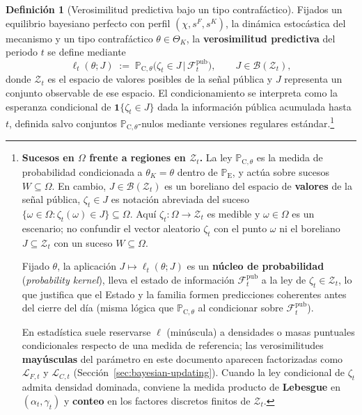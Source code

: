 \documentclass[12pt]{article}
\newenvironment{fnnote}{%
  \begin{minipage}[t]{\linewidth}%
  \sloppy
}{\end{minipage}}
\theoremstyle{definition}
\newtheorem{definition}[theorem]{Definición}
\theoremstyle{remark}
\newcommand{\ProbE}{\mathbb{P}_{\mathrm{E}}}
\newcommand{\ProbC}[1]{\mathbb{P}_{\mathrm{C},#1}}
\newcommand{\1}{\mathbf{1}}
\begin{document}
\begin{definition}[Verosimilitud predictiva bajo un tipo contrafáctico]
\label{def:predictive-likelihood}
Fijados un equilibrio bayesiano perfecto con perfil $(\chi,s^F,s^K)$, la dinámica estocástica del mecanismo y un tipo contrafáctico $\theta\in\Theta_K$, la \textbf{verosimilitud predictiva} del periodo $t$ se define mediante
\begin{equation}
\label{eq:likelihood-zeta}
\ell_t(\theta;J)\;:=\;\ProbC{\theta}\bigl(\zeta_t \in J \,\big|\, \mathcal{F}_t^{\mathrm{pub}}\bigr),
\qquad J\in\mathcal{B}(\mathcal{Z}_t),
\end{equation}
donde $\mathcal{Z}_t$ es el espacio de valores posibles de la señal pública y $J$ representa un conjunto observable de ese espacio. El condicionamiento se interpreta como la esperanza condicional de $\mathbf{1}\{\zeta_t\in J\}$ dada la información pública acumulada hasta $t$, definida salvo conjuntos $\ProbC{\theta}$-nulos mediante versiones regulares estándar.\footnote{%
\begin{fnnote}\textbf{Sucesos en $\Omega$ frente a regiones en $\mathcal{Z}_t$.} La ley $\ProbC{\theta}$ es la medida de probabilidad condicionada a $\theta_K=\theta$ dentro de $\ProbE$, y actúa sobre sucesos $W\subseteq\Omega$. En cambio, $J\in\mathcal{B}(\mathcal{Z}_t)$ es un boreliano del espacio de \textbf{valores} de la señal pública, $\zeta_t\in J$ es notación abreviada del suceso $\{\omega\in\Omega:\zeta_t(\omega)\in J\}\subseteq\Omega$. Aquí $\zeta_t:\Omega\to\mathcal{Z}_t$ es medible y $\omega\in\Omega$ es un escenario; no confundir el vector aleatorio $\zeta_t$ con el punto $\omega$ ni el boreliano $J\subseteq\mathcal{Z}_t$ con un suceso $W\subseteq\Omega$.
\par\smallskip
Fijado $\theta$, la aplicación $J\mapsto\ell_t(\theta;J)$ es un \textbf{núcleo de probabilidad} \textup{(}\emph{probability kernel}\textup{)}, lleva el estado de información $\mathcal{F}_t^{\mathrm{pub}}$ a la ley de $\zeta_t\in\mathcal{Z}_t$, lo que justifica que el Estado y la familia formen predicciones coherentes antes del cierre del día \textup{(}misma lógica que $\ProbC{\theta}$ al condicionar sobre $\mathcal{F}_t^{\mathrm{pub}}$\textup{)}.
\par\smallskip
En estadística suele reservarse $\ell$ \textup{(}minúscula\textup{)} a densidades o masas puntuales condicionales respecto de una medida de referencia; las verosimilitudes \textbf{mayúsculas} del parámetro en este documento aparecen factorizadas como $\mathcal{L}_{F,t}$ y $\mathcal{L}_{C,t}$ \textup{(}Sección~\ref{sec:bayesian-updating}\textup{)}. Cuando la ley condicional de $\zeta_t$ admita densidad dominada, conviene la medida producto de \textbf{Lebesgue} en $(\alpha_t,\gamma_t)$ y \textbf{conteo} en los factores discretos finitos de $\mathcal{Z}_t$.

\end{fnnote}}
\end{definition}
\end{document}

